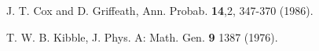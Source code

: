 \documentclass[a4paper,11pt,color]{article}
\renewenvironment{thebibliography}[1]{%
    \begin{oldthebibliography}{#1}%
      \setlength{\parskip}{0ex}%
      \setlength{\itemsep}{0ex}%
  }%
  {%
    \end{oldthebibliography}%
  }
\begin{document}
\begin{thebibliography}{}
















J. T. Cox and D. Griffeath, Ann. Probab. {\bf 14},2, 347-370 (1986).

T. W. B. Kibble, J. Phys. A: Math. Gen. {\bf 9} 1387 (1976).

\end{thebibliography}
\end{document}
